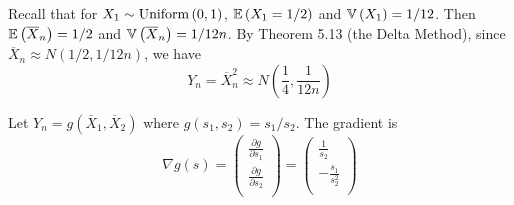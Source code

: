 \documentclass[a4paper]{article}
\begin{document}
Recall that for \(X_{1} \sim \operatorname{Uniform}\left( 0,1 \right)\), \(\mathbb{E}\left( X_{1} = 1/2 \right)\) and \(\mathbb{V}\left( X_{1} \right) = 1/12\). Then \(\mathbb{E}\left( \overline{X}_{n} \right) = 1/2\) and \(\mathbb{V}\left( \overline{X}_{n} \right) = 1/12n\). By Theorem 5.13 (the Delta Method), since \(\overline{X}_{n} \approx N \left( 1/2, 1/12n \right)\), we have
\[
	Y_{n} = \overline{X}^{2}_{n} \approx N \left( \frac{1}{4}, \frac{1}{12n} \right) 
\]


Let \(Y_{n} = g \left( \overline{X}_{1}, \overline{X}_{2} \right) \) where \(g \left( s_{1}, s_{2} \right) = s_{1}/s_{2}\). The gradient is
\[
	\nabla g \left( s \right) = 
	\begin{pmatrix}
		\frac{\partial g}{\partial s_{1}}  \\
		\frac{\partial g}{\partial s_{2}}  \\
	\end{pmatrix}
	=
	\begin{pmatrix}
		\frac{1}{s_{2}} \\
		-\frac{s_{1}}{s^{2}_{2}} \\
	\end{pmatrix}
\]
\end{document}
